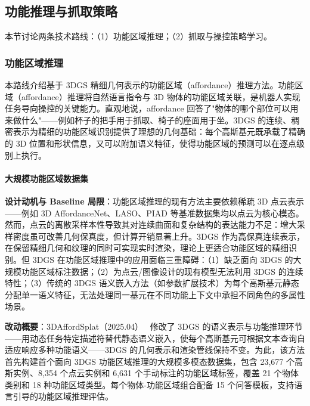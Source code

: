 \subsection{功能推理与抓取策略}
\label{ss:17_2a}

本节讨论两条技术路线：（1）功能区域推理；（2）抓取与操控策略学习。

\subsubsection{功能区域推理}

本路线介绍基于 3DGS 精细几何表示的功能区域（affordance）推理方法。功能区域（affordance）推理将自然语言指令与 3D 物体的功能区域关联，是机器人实现任务导向操控的关键能力。直观地说，affordance 回答了"物体的哪个部位可以用来做什么"——例如杯子的把手用于抓取、椅子的座面用于坐。3DGS 的连续、稠密表示为精细的功能区域识别提供了理想的几何基础：每个高斯基元既承载了精确的 3D 位置和形状信息，又可以附加语义特征，使得功能区域的预测可以在逐点级别上执行。

\paragraph{大规模功能区域数据集}

\textbf{设计动机与 Baseline 局限}：功能区域推理的现有方法主要依赖稀疏 3D 点云表示——例如 3D AffordanceNet、LASO、PIAD 等基准数据集均以点云为核心模态。然而，点云的离散采样本性导致其对连续曲面和复杂结构的表达能力不足：增大采样密度虽可改善几何保真度，但计算开销显著上升。3DGS 作为高保真连续表示，在保留精细几何和纹理的同时可实现实时渲染，理论上更适合功能区域的精细识别。但 3DGS 在功能区域推理中的应用面临三重障碍：（1）缺乏面向 3DGS 的大规模功能区域标注数据；（2）为点云/图像设计的现有模型无法利用 3DGS 的连续特性；（3）传统的 3DGS 语义嵌入方法（如参数扩展技术）为每个高斯基元静态分配单一语义特征，无法处理同一基元在不同功能上下文中承担不同角色的多属性场景。

\textbf{改动概要}：3DAffordSplat（2025.04）~\cite{2504_11218} 修改了 3DGS 的语义表示与功能推理环节——用动态任务特定描述符替代静态语义嵌入，使每个高斯基元可根据文本查询自适应响应多种功能语义——3DGS 的几何表示和渲染管线保持不变。为此，该方法首先构建首个面向 3DGS 功能区域推理的大规模多模态数据集，包含 23,677 个高斯实例、8,354 个点云实例和 6,631 个手动标注的功能区域标签，覆盖 21 个物体类别和 18 种功能区域类型。每个物体-功能区域组合配备 15 个问答模板，支持语言引导的功能区域推理评估。

